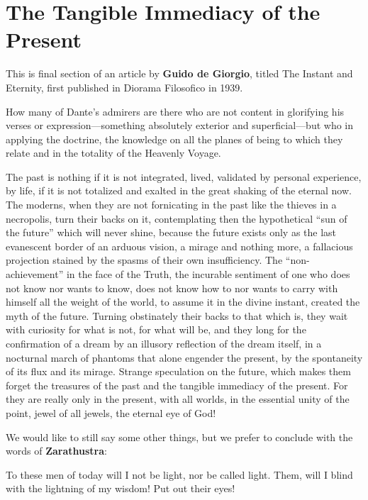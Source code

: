 \section{The Tangible Immediacy of the Present}

\begin{quotex}
This is final section of an article by \textbf{Guido de Giorgio}, titled The Instant and Eternity, first published in Diorama Filosofico in 1939.
\end{quotex}


How many of Dante's admirers are there who are not content in glorifying his verses or expression---something absolutely exterior and superficial---but who in applying the doctrine, the knowledge on all the planes of being to which they relate and in the totality of the Heavenly Voyage.

The past is nothing if it is not integrated, lived, validated by personal experience, by life, if it is not totalized and exalted in the great shaking of the eternal now. The moderns, when they are not fornicating in the past like the thieves in a necropolis, turn their backs on it, contemplating then the hypothetical ``sun of the future'' which will never shine, because the future exists only as the last evanescent border of an arduous vision, a mirage and nothing more, a fallacious projection stained by the spasms of their own insufficiency. The ``non-achievement'' in the face of the Truth, the incurable sentiment of one who does not know nor wants to know, does not know how to nor wants to carry with himself all the weight of the world, to assume it in the divine instant, created the myth of the future. Turning obstinately their backs to that which is, they wait with curiosity for what is not, for what will be, and they long for the confirmation of a dream by an illusory reflection of the dream itself, in a nocturnal march of phantoms that alone engender the present, by the spontaneity of its flux and its mirage. Strange speculation on the future, which makes them forget the treasures of the past and the tangible immediacy of the present. For they are really only in the present, with all worlds, in the essential unity of the point, jewel of all jewels, the eternal eye of God!

We would like to still say some other things, but we prefer to conclude with the words of \textbf{Zarathustra}:

\begin{quotex}
To these men of today will I not be light, nor be called light. Them, will I blind with the lightning of my wisdom! Put out their eyes!
\end{quotex}



